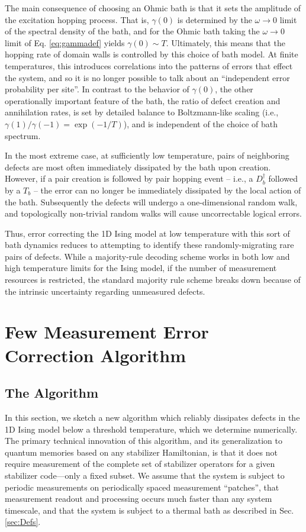 \documentclass[twocolumn,superscriptaddress,aps,prb,floatfix]{revtex4-1}
\begin{document}
 The main consequence of choosing an Ohmic bath is that it sets the amplitude of the excitation hopping process.  That is, $\gamma(0)$ is determined by the $\omega \rightarrow 0$ limit of the spectral density of the bath, and for the Ohmic bath taking the $\omega\rightarrow0$ limit of  Eq. \ref{eq:gammadef} yields $\gamma(0) \sim T$. 
Ultimately, this means that the hopping rate of domain walls is controlled by this choice of bath model. At finite temperatures, this introduces correlations into the patterns of errors that effect the system, and so it is no longer possible to talk about an ``independent error probability per site''. 
In contrast to the behavior of $\gamma(0)$, 
the other operationally important feature of the bath, the ratio of defect creation and annihilation rates, is set by detailed balance to Boltzmann-like scaling (i.e., $\gamma(1)/\gamma(-1) = \exp(-1/T)$), and is independent of the choice of bath spectrum.
 
 In the most extreme case, at sufficiently low temperature, pairs of neighboring defects are most often immediately dissipated by the bath upon creation.  However, if a pair creation is followed by pair hopping event -- i.e., a $D^\dagger_{b}$ followed by a $T_{b}$ -- the error can no longer be immediately dissipated by the local action of the bath.  Subsequently the defects will undergo a one-dimensional random walk, and topologically non-trivial random walks will cause uncorrectable logical errors.
 
 Thus, error correcting the 1D Ising model at low temperature with this sort of bath dynamics reduces to attempting to identify these randomly-migrating rare pairs of defects.  While a majority-rule decoding scheme works in both low and high temperature limits for the Ising model, if the number of measurement resources is restricted, the standard majority rule scheme breaks down because of the intrinsic uncertainty regarding unmeasured defects.
 
 
\section{Few Measurement Error Correction Algorithm}
\label{sec:ecc_alg}

\subsection{The Algorithm}

In this section, we sketch a new algorithm which reliably dissipates defects in the 1D Ising model below a threshold temperature, which we determine numerically.  The primary technical innovation of this algorithm, and its generalization to quantum memories based on any stabilizer Hamiltonian, is that it does not require measurement of the complete set of stabilizer operators for a given stabilizer code---only a fixed subset.  We assume that the system is subject to periodic measurements on periodically spaced measurement ``patches'', that measurement readout and processing occurs much faster than any system timescale, and that the system is subject to a thermal bath as described in Sec. \ref{sec:Defs}.
\end{document}
